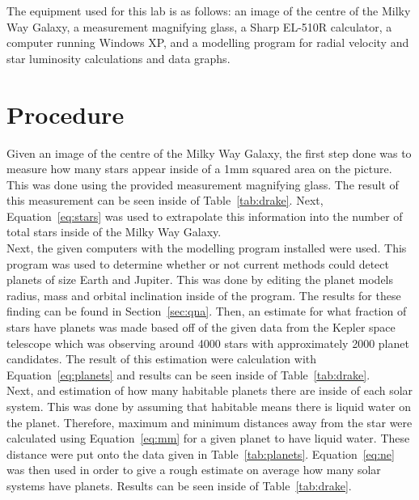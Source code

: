 \documentclass{article}
\begin{document}
The equipment used for this lab is as follows: an image of the centre of the Milky Way Galaxy, a measurement magnifying glass,
 a Sharp EL-510R calculator, a computer running Windows XP, and a modelling program for radial velocity and star luminosity 
calculations and data graphs.


\section{Procedure}
\label{sec:proc}

Given an image of the centre of the Milky Way Galaxy, the first step done was to measure how many stars appear inside of a 1mm squared
area on the picture. This was done using the provided measurement magnifying glass. The result of this measurement can be seen inside of
Table~\ref{tab:drake}. Next, Equation~\ref{eq:stars} was used to extrapolate this information into the number of total stars inside of the 
Milky Way Galaxy.\\

Next, the given computers with the modelling program installed were used. This program was used to determine whether or not current 
methods could detect planets of size Earth and Jupiter. This was done by editing the planet models radius, mass and orbital inclination inside
of the program. The results for these finding can be found in Section~\ref{sec:qna}. Then, an estimate for what fraction of stars have planets
was made based off of the given data from the Kepler space telescope which was observing around 4000 stars with approximately 2000 planet
candidates. The result of this estimation were calculation with Equation~\ref{eq:planets} and results can be seen inside of Table~\ref{tab:drake}.\\

Next, and estimation of how many habitable planets there are inside of each solar system. This was done by assuming that habitable means there
is liquid water on the planet. Therefore, maximum and minimum distances away from the star were calculated using Equation~\ref{eq:mm} for a given
planet to have liquid water. These distance were put onto the data given in Table~\ref{tab:planets}. Equation~\ref{eq:ne} was then used in order to give 
a rough estimate on average how many solar systems have planets. Results can be seen inside of Table~\ref{tab:drake}.\\
\end{document}
